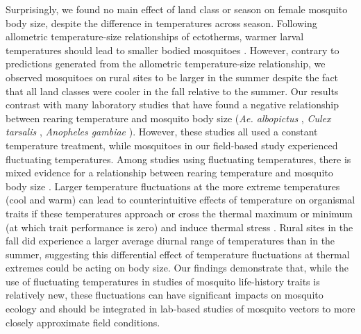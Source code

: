 \documentclass[12pt]{article}
\begin{document}
Surprisingly, we found no main effect of land class or season on female mosquito body size, despite the difference in temperatures across season.
Following allometric temperature-size relationships of ectotherms, warmer larval temperatures should lead to smaller bodied mosquitoes \cite{angilleta2004}.
However, contrary to predictions generated from the allometric temperature-size relationship, we observed mosquitoes on rural sites to be larger in the summer despite the fact that all land classes were cooler in the fall relative to the summer.
Our results contrast with many laboratory studies that have found a negative relationship between rearing temperature and mosquito body size (\textit{Ae. albopictus} \cite{reiskind2012a}, \textit{Culex tarsalis} \cite{dodson2012}, \textit{Anopheles gambiae} \cite{koella1996}).
However, these studies all used a constant temperature treatment, while mosquitoes in our field-based study experienced fluctuating temperatures.
Among studies using fluctuating temperatures, there is mixed evidence for a relationship between rearing temperature and mosquito body size \cite{murdock2017, mohammed2011}.
Larger temperature fluctuations at the more extreme temperatures (cool and warm) can lead to counterintuitive effects of temperature on organismal traits if these temperatures approach or cross the thermal maximum or minimum (at which trait performance is zero) and induce thermal stress \cite{carrington2013, colinet2015}.
Rural sites in the fall did experience a larger average diurnal range of temperatures than in the summer, suggesting this differential effect of temperature fluctuations at thermal extremes could be acting on body size.
Our findings demonstrate that, while the use of fluctuating temperatures in studies of mosquito life-history traits is relatively new, these fluctuations can have significant impacts on mosquito ecology and should be integrated in lab-based studies of mosquito vectors to more closely approximate field conditions.
\end{document}
